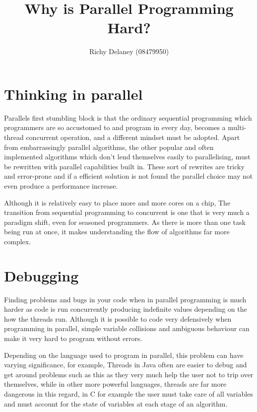\documentclass{article}
\title{ Why is Parallel Programming Hard?}
\author{ Richy Delaney (08479950)}
\begin{document}
 \maketitle 


\section*{ Thinking in parallel}


Parallels first stumbling block is that the ordinary sequential programming which programmers are so accustomed to and program in every day, becomes a multi-thread concurrent operation, and a different mindset must be adopted. Apart from embarrassingly parallel algorithms, the other popular and often implemented algorithms which don't lend themselves easily to parallelising, must be rewritten with parallel capabilities built in. These sort of rewrites are tricky and error-prone and if a efficient solution is not found the parallel choice may not even produce a performance increase.



Although it is relatively easy to place more and more cores on a chip, The transition from sequential programming to concurrent is one that is very much a paradigm shift, even for seasoned programmers. As there is more than one task being run at once, it makes understanding the flow of algorithms far more complex. 



\section*{ Debugging}


Finding problems and bugs in your code when in parallel programming is much harder as code is run concurrently producing indefinite values depending on the how the threads run. Although it is possible to code very defensively when programming in parallel, simple variable collisions and ambiguous behaviour can make it very hard to program without errors.  



Depending on the language used to program in parallel, this problem can have varying significance, for example, Threads in Java often are easier to debug and get around problems such as this as they very much help the user not to trip over themselves, while in other more powerful languages, threads are far more dangerous in this regard, in C for example the user must take care of all variables and must account for the state of variables at each stage of an algorithm.
\end{document}
